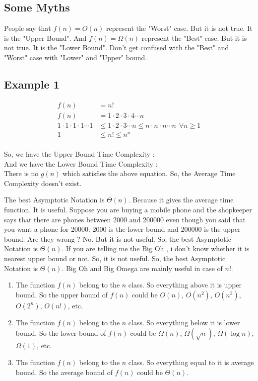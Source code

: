\documentclass{article}
\begin{document}
\subsection{Some Myths}

People say that $f(n) = O(n)$ represent the "Worst" case. But it is not true. It is the "Upper Bound". And $f(n) = \Omega(n)$ represent the "Best" case. But it is not true. It is the "Lower Bound".
\newline
Don't get confused with the "Best" and "Worst" case with "Lower" and "Upper" bound.

\subsection{ Example 1}
\[
\begin{aligned}
    f(n) &= n! \\
    f(n) &= 1 \cdot 2 \cdot 3 \cdot 4 \cdots n \\
    1 \cdot 1 \cdot 1 \cdot 1 \cdots 1 &\leq 1 \cdot 2 \cdot 3 \cdots n \leq n \cdot n \cdot n \cdots n \hspace{5pt} \forall n \geq 1 \\
    1 &\leq n! \leq n^n \\
\end{aligned}
\]

So, we have the Upper Bound Time Complexity :   \\
And we have the Lower Bound Time Complexity :   \\
There is no $g(n)$ which satisfies the above equation. So, the Average Time Complexity doesn't exist.


The best Asymptotic Notation is $\Theta(n)$. Because it gives the average time function. It is useful.
Suppose you are buying a mobile phone and the shopkeeper says that there are phones between 2000 and 200000 even though you said that you want a phone for 20000. 2000 is the lower bound and 200000 is the upper bound. Are they wrong
? No. But it is not useful. So, the best Asymptotic Notation is $\Theta(n)$. 
If you are telling me the Big Oh , i don't know whether it is nearest upper bound or not. So, it is not useful. So, the best Asymptotic Notation is $\Theta(n)$.
Big Oh and Big Omega are mainly useful in case of $n!$.

\begin{enumerate}
    \item The function $f(n)$ belong to the $n$ class. So everything above it is upper bound. So the upper bound of $f(n)$ could be $O(n)$, $O(n^2)$, $O(n^3)$, $O(2^n)$, $O(n!)$, etc.

    \item The function $f(n)$ belong to the $n$ class. So everything below it is lower bound. So the lower bound of $f(n)$ could be $\Omega(n)$, $\Omega(\sqrt{n})$, $\Omega(\log{n})$, $\Omega(1)$, etc.

    \item The function $f(n)$ belong to the $n$ class. So everything equal to it is average bound. So the average bound of $f(n)$ could be $\Theta(n)$.
\end{enumerate}
\end{document}
